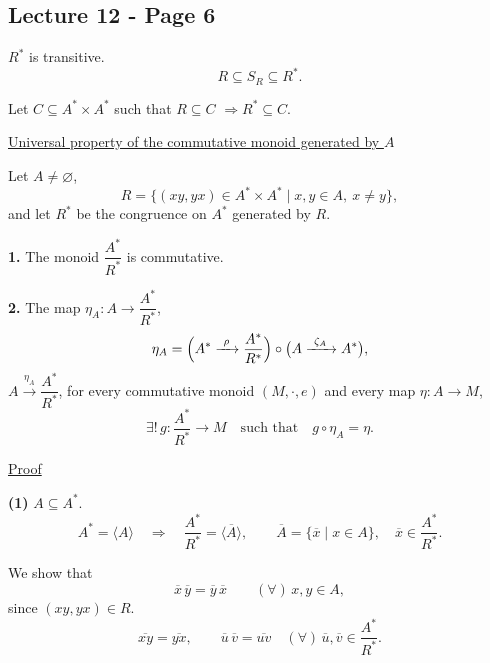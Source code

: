 
\subsection*{Lecture 12 - Page 6}

\noindent $R^*$ is transitive.
\[
R\subseteq S_R\subseteq R^*.
\]

\noindent Let $C\subseteq A^*\times A^*$ such that $R\subseteq C$
$\Rightarrow R^*\subseteq C$.

\bigskip
\noindent\underline{Universal property of the commutative monoid generated by $A$}

\medskip
\noindent{}\quad Let $A\neq\varnothing$,
\[
R=\bigl\{(xy,yx)\in A^*\times A^*\mid x,y\in A,\ x\neq y\bigr\},
\]
\noindent and let $R^*$ be the congruence on $A^*$ generated by $R$.

\medskip
\noindent\textbf{1.} The monoid $\dfrac{A^*}{R^*}$ is commutative.

\medskip
\noindent\textbf{2.} The map $\eta_A:A\longrightarrow\dfrac{A^*}{R^*}$,
\[
\eta_A=\Bigl(A^*\xrightarrow{\ \rho\ }\frac{A^*}{R^*}\Bigr)
\circ\bigl(A\xrightarrow{\ \zeta_A\ }A^*\bigr),
\]
\noindent $A\xrightarrow{\eta_A}\dfrac{A^*}{R^*}$, for every
commutative monoid $(M,\cdot,e)$ and every map $\eta:A\to M$,
\[
\exists!\,g:\frac{A^*}{R^*}\longrightarrow M
\quad\text{such that}\quad g\circ\eta_A=\eta.
\]

\bigskip
\noindent\underline{Proof}

\medskip
\noindent\textbf{(1)} $A\subseteq A^*$.
\[
A^*=\langle A\rangle\quad\Longrightarrow\quad
\frac{A^*}{R^*}=\langle\overline A\rangle,
\qquad \overline A=\{\overline x\mid x\in A\},
\quad\overline x\in\frac{A^*}{R^*}.
\]

\noindent We show that
\[
\overline x\,\overline y=\overline y\,\overline x
\qquad (\forall)\,x,y\in A,
\]
\noindent since $(xy,yx)\in R$.
\[
\overline{xy}=\overline{yx},\qquad
\overline u\,\overline v=\overline{uv}
\quad (\forall)\,\overline u,\overline v\in\frac{A^*}{R^*}.
\]


